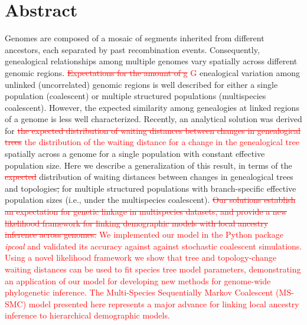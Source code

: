 \documentclass[11pt]{article}
\begin{document}
\section*{Abstract}
Genomes are composed of a mosaic of segments inherited from different ancestors, 
each separated by past recombination events. Consequently, genealogical
relationships among multiple genomes vary spatially across different genomic 
regions. 
\textcolor{red}{
\sout{Expectations for the amount of g}
G}
enealogical variation among unlinked 
(uncorrelated) genomic regions is well described for either a single 
population (coalescent) or multiple structured populations (multispecies coalescent).
However, the expected similarity among genealogies at linked regions of a 
genome is less well characterized. 
Recently, an analytical solution was derived for 
%
%
\textcolor{red}{
\sout{the expected distribution of waiting distances between changes in genealogical trees} 
the distribution of the waiting distance for a change in the genealogical tree} 
spatially across a genome for a single population with constant effective 
population size. Here we describe a generalization of this 
result, in terms of the 
\textcolor{red}{\sout{expected}}
distribution of waiting distances between 
changes in genealogical trees and topologies\sout{,} for multiple structured populations
with branch-specific effective population sizes (i.e., under the multispecies 
coalescent). 
\textcolor{red}{
\sout{
Our solutions establish an expectation for genetic linkage in multispecies
datasets, and provide a new likelihood framework for linking demographic models 
with local ancestry inference across genomes.
}
We implemented our model in the Python package \emph{ipcoal} and validated its
accuracy against against stochastic coalescent simulations. Using a novel
likelihood framework we show that tree and topology-change waiting distances
can be used to fit species tree model parameters, demonstrating an application
of our model for developing new methods for genome-wide phylogenetic inference.
The Multi-Species Sequentially Markov Coalescent (MS-SMC) model presented here
represents a major advance for linking local ancestry inference to hierarchical
demographic models.
}
\end{document}
